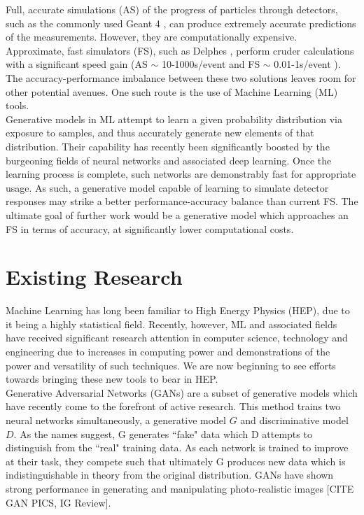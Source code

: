 \documentclass{report}
\begin{document}
Full, accurate simulations (AS) of the progress of particles through detectors, such as the commonly used Geant 4 \cite{geant4}, can produce extremely accurate predictions of the measurements. However, they are computationally expensive. Approximate, fast simulators (FS), such as Delphes \cite{delphes}, perform cruder calculations with a significant speed gain (AS $\sim$ 10-1000s/event and FS $\sim$ 0.01-1s/event \cite{delphessl}). The accuracy-performance imbalance between these two solutions leaves room for other potential avenues. One such route is the use of Machine Learning (ML) tools.\\

Generative models in ML attempt to learn a given probability distribution via exposure to samples, and thus accurately generate new elements of that distribution. Their capability has recently been significantly boosted by the burgeoning fields of neural networks and associated deep learning. Once the learning process is complete, such networks are demonstrably fast for appropriate usage. As such, a generative model capable of learning to simulate detector responses may strike a better performance-accuracy balance than current FS. The ultimate goal of further work would be a generative model which approaches an FS in terms of accuracy, at significantly lower computational costs.\\

\section{Existing Research}

Machine Learning has long been familiar to High Energy Physics (HEP), due to it being a highly statistical field. Recently, however, ML and associated fields have received significant research attention in computer science, technology and engineering due to increases in computing power and demonstrations of the power and versatility of such techniques. We are now beginning to see efforts towards bringing these new tools to bear in HEP.\\

Generative Adversarial Networks (GANs) \cite{gan1} are a subset of generative models which have recently come to the forefront of active research. This method trains two neural networks simultaneously, a generative model $G$ and discriminative model $D$. As the names suggest, G generates ``fake" data which D attempts to distinguish from the ``real" training data. As each network is trained to improve at their task, they compete such that ultimately G produces new data which is indistinguishable in theory from the original distribution. GANs have shown strong performance in generating and manipulating photo-realistic images [CITE GAN PICS, IG Review].\\
\end{document}
